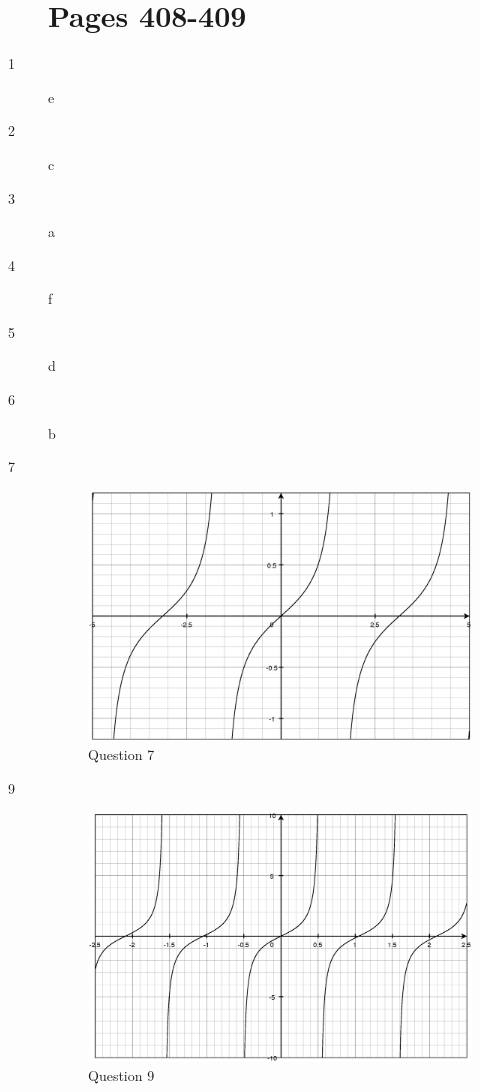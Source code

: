 \documentclass[fleqn,addpoints]{exam}
\begin{document}
\begin{description}
\section{Pages 408-409}

\item[1] e
\item[2] c
\item[3] a
\item[4] f
\item[5] d
\item[6] b

\item[7]
\begin{figure}[H]
  \centering
  \includegraphics[scale=.3]{question_4.6_7.eps}
  \caption*{Question 7}
\end{figure}

\item[9]
\begin{figure}[H]
  \centering
  \includegraphics[scale=.3]{question_4.6_9.eps}
  \caption*{Question 9}
\end{figure}


\end{description}
\end{document}
